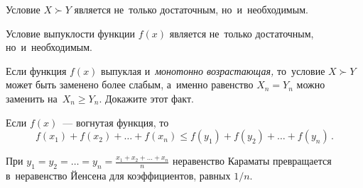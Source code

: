 Условие $X \succ Y$ является не~только достаточным, но~и~необходимым.

Условие выпуклости функции $f(x)$ является не~только достаточным,
но~и~необходимым.

Если функция $f(x)$ выпуклая и~\emph{монотонно возрастающая,} то~условие
$X \succ Y$ может быть заменено более слабым, а~именно равенство $X_n = Y_n$
можно заменить на~$X_n \geq Y_n$.
Докажите этот факт.

Если $f(x)$~--- вогнутая функция, то%
\[
    f(x_1) + f(x_2) + \ldots + f(x_n)
\leq
    f(y_1) + f(y_2) + \ldots + f(y_n)
\,.\]

При $y_1 = y_2 = \ldots = y_n = \frac{x_1 + x_2 + \ldots + x_n}{n}$
неравенство Караматы превращается в~неравенство Йенсена для коэффициентов,
равных $1 / n$.


